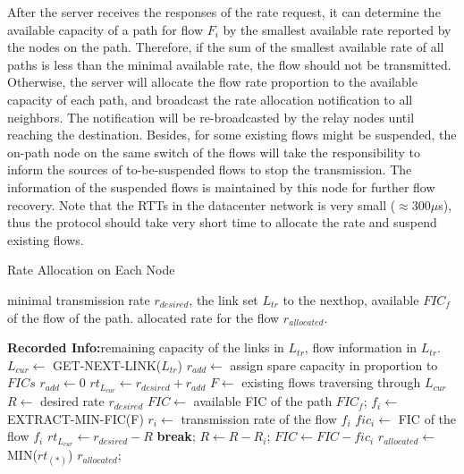 \documentclass[conference]{IEEEtran}
\begin{document}
After the server receives the responses of the rate request, it can determine the available capacity of a path for flow $F_{i}$ by the smallest available rate reported by the nodes on the path. Therefore, if the sum of the smallest available rate of all paths is less than the minimal available rate, the flow should not be transmitted. Otherwise, the server will allocate the flow rate proportion to the available capacity of each path, and broadcast the rate allocation notification to all neighbors. The notification will be re-broadcasted by the relay nodes until reaching the destination. Besides, for some existing flows might be suspended, the on-path node on the same switch of the flows will take the responsibility to inform the sources of to-be-suspended flows to stop the transmission. The information of the suspended flows is maintained by this node for further flow recovery. Note that the RTTs in the datacenter network is very small ($\approx300\mu$s), thus the protocol should take very short time to allocate the rate and suspend existing flows.

\begin{tiny}
\renewcommand{\algorithmicrequire}{\textbf{Input:}}
\renewcommand{\algorithmicensure}{\textbf{Output:}}
\newcommand{\RECORD}{\textbf{Recorded Info:}}
\newcommand{\factorial}{\ensuremath{\mbox{\sc Factorial}}}
\begin{algorithm}[h!]
\caption{Rate Allocation on Each Node} \label{alg:rate-allocation}
\begin{algorithmic}[1]
\REQUIRE minimal transmission rate $r_{desired}$, the link set $L_{tr}$ to the nexthop, available $FIC_{f}$ of the flow of the path.
\ENSURE allocated rate for the flow $r_{allocated}$.

\RECORD remaining capacity of the links in $L_{tr}$, flow information in $L_{tr}$.
\medskip
{}
\STATE $L_{cur} \leftarrow$ GET-NEXT-LINK($L_{tr}$)
\STATE $r_{add} \leftarrow$  assign spare capacity in proportion to $FICs$
\ELSE
\STATE $r_{add} \leftarrow 0$
\ENDIF
\STATE $rt_{L_{cur}} \leftarrow r_{desired} + r_{add} $
\ELSE
\STATE $F \leftarrow$ {existing flows traversing through $L_{cur}$}
\STATE $R  \leftarrow$ desired rate $r_{desired}$
\STATE $FIC \leftarrow$ available FIC of the path $FIC_{f}$;
\STATE $f_{i} \leftarrow$ EXTRACT-MIN-FIC(F)
\STATE $r_{i} \leftarrow$ transmission rate of the flow $f_{i}$
\STATE $fic_{i} \leftarrow$ FIC of the flow $f_{i}$
\STATE $rt_{L_{cur}} \leftarrow r_{desired} - R$
\STATE \textbf{break};
\ENDIF
\STATE $R \leftarrow R - R_{i} $;
\STATE $FIC \leftarrow FIC - fic_{i}$
\ENDWHILE
\ENDIF
\ENDWHILE
\STATE $r_{allocated} \leftarrow$ MIN($rt_{(*)}$)
\RETURN $r_{allocated}$;
\end{algorithmic}
\end{algorithm}
\end{tiny}
\end{document}
